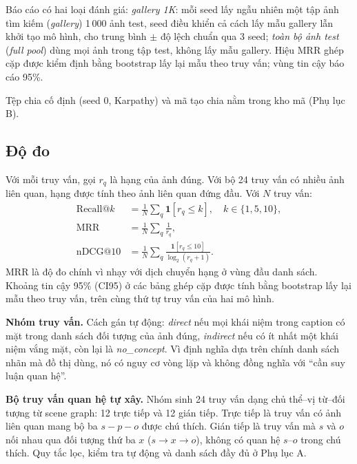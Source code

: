 \documentclass[conference]{IEEEtran}
\begin{document}
Báo cáo có hai loại đánh giá: \emph{gallery 1K}: mỗi seed lấy ngẫu nhiên một tập ảnh tìm kiếm (\emph{gallery}) 1\,000 ảnh test, seed điều khiển cả cách lấy mẫu gallery lẫn khởi tạo mô hình, cho trung bình $\pm$ độ lệch chuẩn qua 3 seed; \emph{toàn bộ ảnh test} (\emph{full pool}) dùng mọi ảnh trong tập test, không lấy mẫu gallery. Hiệu MRR ghép cặp được kiểm định bằng bootstrap lấy lại mẫu theo truy vấn; vùng tin cậy báo cáo 95\%.

Tệp chia cố định (seed 0, Karpathy) và mã tạo chia nằm trong kho mã (Phụ lục B).

\subsection{Độ đo}\label{sec:metrics}
Với mỗi truy vấn, gọi $r_q$ là hạng của ảnh đúng. Với bộ 24 truy vấn có nhiều ảnh liên quan, hạng được tính theo ảnh liên quan đứng đầu. Với $N$ truy vấn:
\begin{align}
\mathrm{Recall@}k &= \tfrac{1}{N}\textstyle\sum_q \mathbf{1}[r_q\le k],\quad k\in\{1,5,10\},\\
\mathrm{MRR} &= \tfrac{1}{N}\textstyle\sum_q \tfrac{1}{r_q},\\
\mathrm{nDCG@10} &= \tfrac{1}{N}\textstyle\sum_q \tfrac{\mathbf{1}[r_q\le10]}{\log_2(r_q+1)}.
\end{align}
MRR là độ đo chính vì nhạy với dịch chuyển hạng ở vùng đầu danh sách. Khoảng tin cậy 95\% (CI95) ở các bảng ghép cặp được tính bằng bootstrap lấy lại mẫu theo truy vấn, trên cùng thứ tự truy vấn của hai mô hình.

\textbf{Nhóm truy vấn.} Cách gán tự động: \emph{direct} nếu mọi khái niệm trong caption có mặt trong danh sách đối tượng của ảnh đúng, \emph{indirect} nếu có ít nhất một khái niệm vắng mặt, còn lại là \emph{no\_concept}. Vì định nghĩa dựa trên chính danh sách nhãn mà đồ thị dùng, nó có nguy cơ vòng lặp và không đồng nghĩa với ``cần suy luận quan hệ''.

\textbf{Bộ truy vấn quan hệ tự xây.} Nhóm sinh 24 truy vấn dạng chủ thể--vị từ--đối tượng từ scene graph: 12 trực tiếp và 12 gián tiếp. Trực tiếp là truy vấn có ảnh liên quan mang bộ ba $s-p-o$ được chú thích. Gián tiếp là truy vấn mà $s$ và $o$ nối nhau qua đối tượng thứ ba $x$ ($s\to x\to o$), không có quan hệ $s$--$o$ trong chú thích. Quy tắc lọc, kiểm tra tự động và danh sách đầy đủ ở Phụ lục A.
\end{document}
